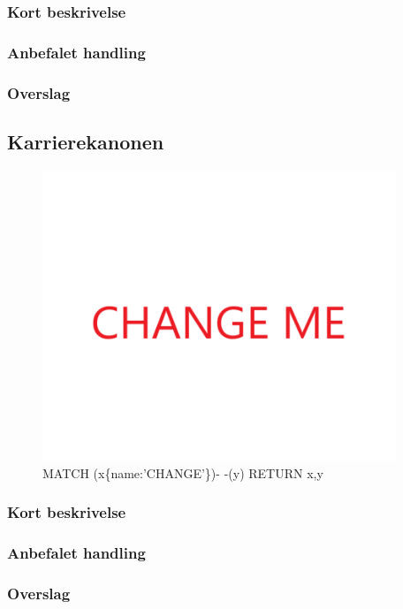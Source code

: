 \documentclass{article}
\begin{document}
\subsubsection{Kort beskrivelse}
\subsubsection{Anbefalet handling}
\subsubsection{Overslag}
\subsection{Karrierekanonen}
\begin{figure}[h]
\includegraphics[width=300pt]{CHANGE.PNG}
\caption{MATCH (x\{name:'CHANGE'\})- -(y) RETURN x,y}
\end{figure}
\subsubsection{Kort beskrivelse}
\subsubsection{Anbefalet handling}
\subsubsection{Overslag}
\end{document}

